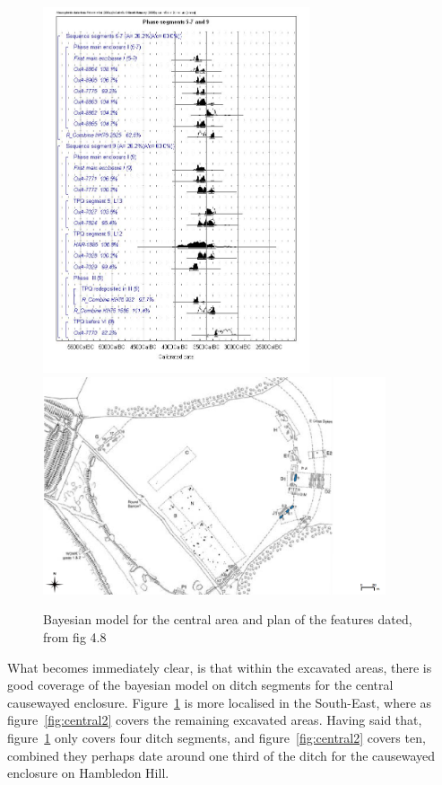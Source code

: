 \begin{figure}
\centering
	\includegraphics[width=0.7\textwidth]{figures/model1}
	\includegraphics[width=0.9\textwidth]{figures/model1-plan}
  \caption{Bayesian model for the central area and plan of the features dated, from fig 4.8 \citep[139]{Whittle:2011kl}}
  \label{fig:central1}
\end{figure}

What becomes immediately clear, is that within the excavated areas, there is good coverage of the bayesian model on ditch segments for the central causewayed enclosure. Figure~\ref{fig:central1} is more localised in the South-East, where as figure~\ref{fig:central2} covers the remaining excavated areas. Having said that, figure~\ref{fig:central1} only covers four ditch segments, and figure~\ref{fig:central2} covers ten, combined they perhaps date around one third of the ditch for the causewayed enclosure on Hambledon Hill. 

